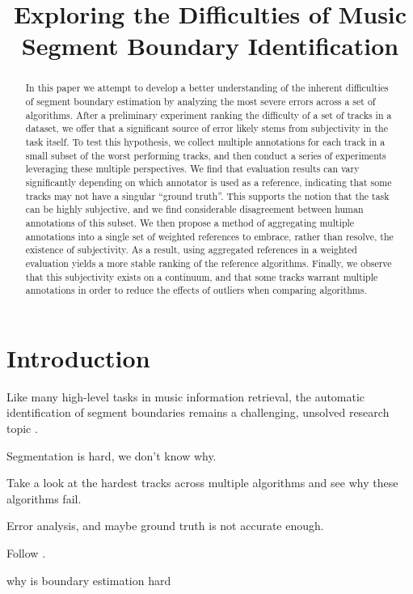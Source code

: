 \documentclass{article}
\title{Exploring the Difficulties of Music Segment Boundary Identification}
\begin{document}
%
\maketitle
%
\begin{abstract}
In this paper we attempt to develop a better understanding of the inherent difficulties of segment boundary estimation by analyzing the most severe errors across a set of algorithms.
After a preliminary experiment ranking the difficulty of a set of tracks in a dataset, we offer that a significant source of error likely stems from subjectivity in the task itself.
To test this hypothesis, we collect multiple annotations for each track in a small subset of the worst performing tracks, and then conduct a series of experiments leveraging these multiple perspectives.
We find that evaluation results can vary significantly depending on which annotator is used as a reference, indicating that some tracks may not have a singular ``ground truth''.
This supports the notion that the task can be highly subjective, and we find considerable disagreement between human annotations of this subset.
We then propose a method of aggregating multiple annotations into a single set of weighted references to embrace, rather than resolve, the existence of subjectivity.
As a result, using  aggregated references in a weighted evaluation yields a more stable ranking of the reference algorithms. 
Finally, we observe that this subjectivity exists on a continuum, and that some tracks warrant multiple annotations in order to reduce the effects of outliers when comparing algorithms.

  
\end{abstract}
%
\section{Introduction}\label{sec:introduction}

Like many high-level tasks in music information retrieval, the automatic identification of segment boundaries remains a challenging, unsolved research topic . 

Segmentation is hard, we don't know why.

Take a look at the hardest tracks across multiple algorithms and see why these algorithms fail.

Error analysis, and maybe ground truth is not accurate enough.

Follow \cite{Grosche2010}.

why is boundary estimation hard
\end{document}
